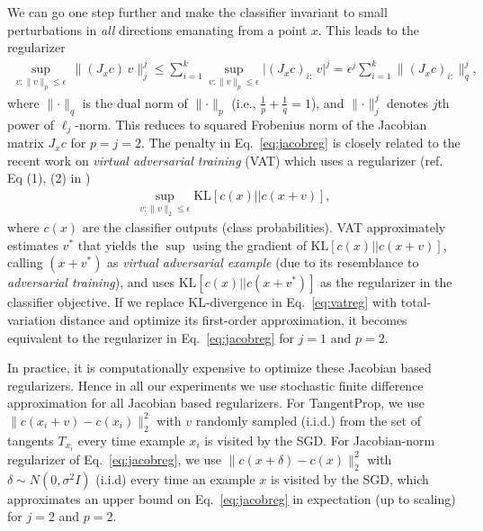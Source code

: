 \documentclass{article}
\begin{document}
We can go one step further and make the classifier invariant to small perturbations in \emph{all} directions emanating from a point $x$. This leads to the regularizer
\begin{align}
\sup_{v:\lVert v\rVert_p \leq \epsilon}\, \lVert (J_xc)\, v \rVert_j^j \leq \sum_{i=1}^k \sup_{v:\lVert v\rVert_p \leq \epsilon} \lvert (J_xc)_{i:}\, v \rvert^j = \epsilon^j \sum_{i=1}^k  \lVert (J_xc)_{i:}\rVert_q^j,  
\label{eq:jacobreg}
\end{align}\noindent where $\lVert\cdot\rVert_q$ is the dual norm of $\lVert\cdot\rVert_p$ (i.e., $\frac{1}{p}+\frac{1}{q}=1$), and $\lVert\cdot\rVert_j^j$ denotes $j$th power of $\ell_j$-norm. This reduces to squared Frobenius norm of the Jacobian matrix $J_xc$ for $p=j=2$. The penalty in Eq.~\eqref{eq:jacobreg} is closely related to the recent work on \emph{virtual adversarial training} (VAT) \cite{miyato2015distributional} which uses a regularizer (ref. Eq (1), (2) in \cite{miyato2015distributional})
\begin{align}
\sup_{v:\lVert v\rVert_2 \leq \epsilon} \text{KL} [ c(x) || c(x+v)], 
\label{eq:vatreg}
\end{align}\noindent where $c(x)$ are the classifier outputs (class probabilities). VAT\cite{miyato2015distributional} approximately estimates $v^*$ that yields the $\sup$ using the gradient of $\text{KL} [ c(x) || c(x+v)]$, calling $(x+v^*)$ as \emph{virtual adversarial example} (due to its resemblance to \emph{adversarial training}\cite{goodfellow2014explaining}), and uses $\text{KL} [ c(x) || c(x+v^*)]$ as the regularizer in the classifier objective. If we replace KL-divergence in Eq.~\ref{eq:vatreg} with total-variation distance and optimize its first-order approximation, it becomes equivalent to the regularizer in Eq.~\eqref{eq:jacobreg} for $j=1$ and $p=2$.  

In practice, it is computationally expensive to optimize these Jacobian based regularizers. Hence in all our experiments we use stochastic finite difference approximation for all Jacobian based regularizers. For TangentProp, we use $\lVert c(x_i+v) - c(x_i)\rVert_2^2$ with $v$ randomly sampled (i.i.d.) from the set of tangents $T_{x_i}$ every time example $x_i$ is visited by the SGD. For Jacobian-norm regularizer of Eq.~\eqref{eq:jacobreg}, we use $\lVert c(x+\delta) - c(x)\rVert_2^2$ with $\delta\sim N(0,\sigma^2 I)$ (i.i.d) every time an example $x$ is visited by the SGD, which approximates an upper bound on Eq.~\eqref{eq:jacobreg} in expectation (up to scaling) for $j=2$ and $p=2$. 
\end{document}
